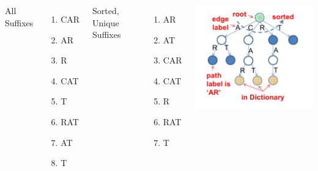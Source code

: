 \begin{frame}
{    \begin{columns}[T]
      All Suffixes
      \begin{enumerate}
      \item CAR
      \item AR
      \item R
      \item CAT
      \item T
      \item RAT
      \item AT
      \item T
      \end{enumerate}
      Sorted, Unique Suffixes
      \begin{enumerate}
      \item AR
      \item AT
      \item CAR
      \item CAT
      \item R
      \item RAT
      \item T
      \end{enumerate}
      \includegraphics[width=.9\textwidth]{../img/suffixtrie_halim}\\
    \end{columns}
  }
\end{frame}


